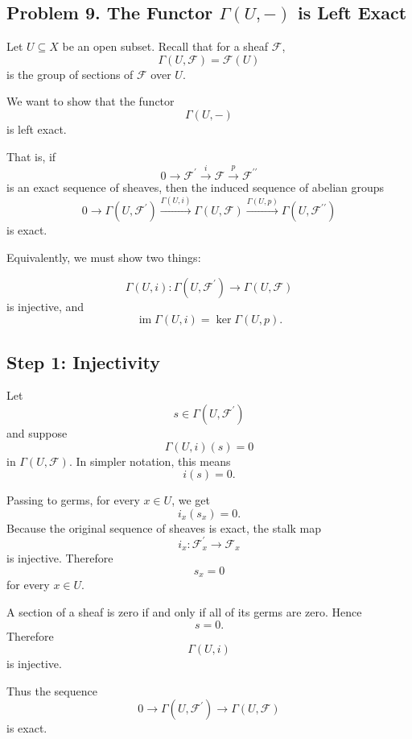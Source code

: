 
\subsection*{Problem 9. The Functor \texorpdfstring{\(\Gamma(U,-)\)}{Gamma(U,-)} is Left Exact}

Let \(U\subseteq X\) be an open subset. Recall that for a sheaf \(\mathcal{F}\),
\[
\Gamma(U,\mathcal{F})=\mathcal{F}(U)
\]
is the group of sections of \(\mathcal{F}\) over \(U\).

We want to show that the functor
\[
\Gamma(U,-)
\]
is left exact.

That is, if
\[
0\longrightarrow \mathcal{F}^{\prime}
\xrightarrow{i}
\mathcal{F}
\xrightarrow{p}
\mathcal{F}^{\prime\prime}
\]
is an exact sequence of sheaves, then the induced sequence of abelian groups
\[
0\longrightarrow \Gamma(U,\mathcal{F}^{\prime})
\xrightarrow{\Gamma(U,i)}
\Gamma(U,\mathcal{F})
\xrightarrow{\Gamma(U,p)}
\Gamma(U,\mathcal{F}^{\prime\prime})
\]
is exact.

Equivalently, we must show two things:

\[
\Gamma(U,i):\Gamma(U,\mathcal{F}^{\prime})\longrightarrow \Gamma(U,\mathcal{F})
\]
is injective, and
\[
\operatorname{im} \Gamma(U,i)=\ker \Gamma(U,p).
\]

\subsection{Step 1: Injectivity}

Let
\[
s\in \Gamma(U,\mathcal{F}^{\prime})
\]
and suppose
\[
\Gamma(U,i)(s)=0
\]
in \(\Gamma(U,\mathcal{F})\). In simpler notation, this means
\[
i(s)=0.
\]

Passing to germs, for every \(x\in U\), we get
\[
i_x(s_x)=0.
\]
Because the original sequence of sheaves is exact, the stalk map
\[
i_x:\mathcal{F}^{\prime}_x\longrightarrow \mathcal{F}_x
\]
is injective. Therefore
\[
s_x=0
\]
for every \(x\in U\).

A section of a sheaf is zero if and only if all of its germs are zero. Hence
\[
s=0.
\]
Therefore
\[
\Gamma(U,i)
\]
is injective.

Thus the sequence
\[
0\longrightarrow \Gamma(U,\mathcal{F}^{\prime})
\longrightarrow \Gamma(U,\mathcal{F})
\]
is exact.

